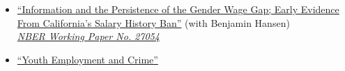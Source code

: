 \documentclass[11pt,english]{article}
\renewcommand{\section}[2]{
        \pagebreak[3]%
        \vspace{1.0\baselineskip}%
        \phantomsection\addcontentsline{toc}{section}{#1}%
        \hspace{0in}%
        {\raggedright \scshape \large \textbf{#1}}%
        \vspace{0.25\baselineskip}#2
}
\begin{document}
\begin{itemize}[label={},itemindent=-2em,leftmargin=2em]
  \item\href{https://drewmcnichols.github.io/salary_history_ban.pdf}{``Information and the Persistence of the Gender Wage Gap; Early Evidence From California's Salary History Ban''} (with Benjamin Hansen) \\
    \href{https://www.nber.org/papers/w27054}{\emph{ NBER Working Paper No. 27054}}
\item \href{https://drewmcnichols.github.io/youth_employment_and_crime.pdf}{``Youth Employment and Crime''}  \\
\end{itemize}
\vspace*{-1cm}



\end{document}
